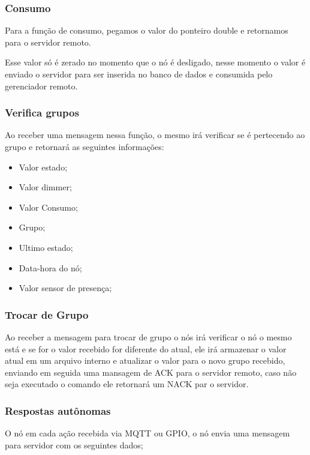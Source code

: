 \documentclass[openright]{normas-utf-tex} %
\begin{document}
\subsubsection{Consumo}
Para a função de consumo, pegamos o valor do ponteiro double e retornamos para o servidor remoto.

Esse valor só é zerado no momento que o nó é desligado, nesse momento o valor é enviado o servidor para ser inserida no banco de dados e consumida pelo gerenciador remoto.

\subsubsection{Verifica grupos}

Ao receber uma mensagem nessa função, o mesmo irá verificar se é pertecendo ao grupo e retornará as seguintes informações:

\begin{itemize}
    \item Valor estado;
    \item Valor dimmer;
    \item Valor Consumo;
    \item Grupo;
    \item Ultimo estado;
    \item Data-hora do nó;
    \item Valor sensor de presença;
\end{itemize}

\subsubsection{Trocar de Grupo}
Ao receber a mensagem para trocar de grupo o nós irá verificar o nó o mesmo está e se for o valor recebido for diferente do atual, ele irá armazenar o valor atual em um arquivo interno e atualizar o valor para o novo grupo recebido, enviando em seguida uma mansagem de ACK para o servidor remoto, caso não seja executado o comando ele retornará um NACK par o servidor.

\subsubsection{Respostas autônomas}
O nó em cada ação recebida via MQTT ou GPIO, o nó envia uma mensagem para servidor com os seguintes dados;
\end{document}
